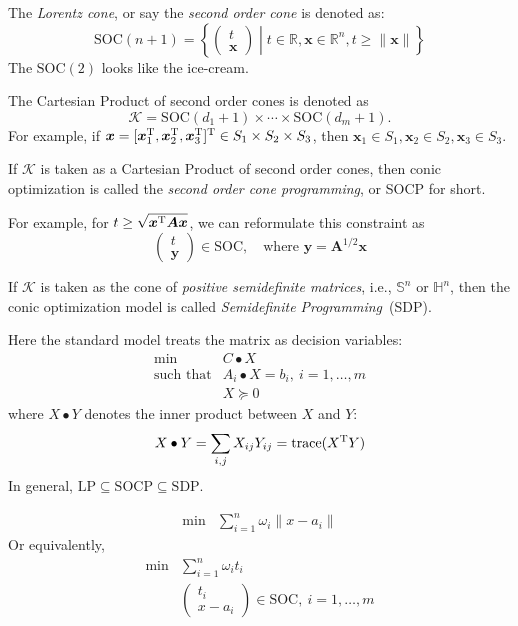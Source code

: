 \begin{example}
The \emph{Lorentz cone}, or say the \emph{second order cone} is denoted as:
\[
\text{SOC}(n+1)=\left\{
\begin{pmatrix}
t\\\bm x
\end{pmatrix}\middle|
t\in\mathbb{R},\bm x\in\mathbb{R}^n, t\ge\|\bm x\|
\right\}
\]
The $\text{SOC}(2)$ looks like the ice-cream.

The Cartesian Product of second order cones is denoted as
\[
\mathcal{K} = \text{SOC}(d_1+1)\times\cdots\times\text{SOC}(d_m+1).
\]
For example, if $\bm x=[\bm x_1^{\mathrm T},\bm x_2^{\mathrm T},\bm x_3^{\mathrm T}]^{\mathrm T}\in S_1\times S_2\times S_3$, then $\bm x_1\in S_1,\bm x_2\in S_2,\bm x_3\in S_3$.

If $\mathcal{K}$ is taken as a Cartesian Product of second order cones, then conic optimization is called the \emph{second order cone programming}, or SOCP for short.

For example, for $t\ge\sqrt{\bm x^{\mathrm T}\bm A\bm x}$, we can reformulate this constraint as
\[
\begin{pmatrix}
t\\\bm y
\end{pmatrix}\in\text{SOC},\quad
\text{where }\bm y = \bm A^{1/2}\bm x
\]
\end{example}

\begin{example}
If $\mathcal{K}$ is taken as the cone of \emph{positive semidefinite matrices}, i.e., $\mathbb{S}^n$ or $\mathbb{H}^n$, then the conic optimization model is called \emph{Semidefinite Programming}~(SDP).

Here the standard model treats the matrix as decision variables:
\[
\begin{array}{ll}
\min&C\bullet X\\
\mbox{such that}&A_i\bullet X=b_{i},\ i=1,\dots,m\\
&X\succeq0
\end{array}
\]
where $X\bullet Y$ denotes the inner product between $X$ and $Y$:
\[
X\bullet Y=\sum_{i,j}X_{ij}Y_{ij}=\operatorname{trace}(X^{\mathrm T} Y)
\]
In general, $\text{LP}\subseteq\text{SOCP}\subseteq\text{SDP}$.
\end{example}

\begin{example}
\[
\begin{array}{ll}
\min&\sum_{i=1}^n\omega_i\|x - a_i\|
\end{array}
\]
Or equivalently,
\[
\begin{array}{ll}
\min&\sum_{i=1}^n\omega_it_i\\
&\begin{pmatrix}
t_i\\x-a_i
\end{pmatrix}\in\text{SOC},\ i=1,\dots,m
\end{array}
\]
\end{example}

